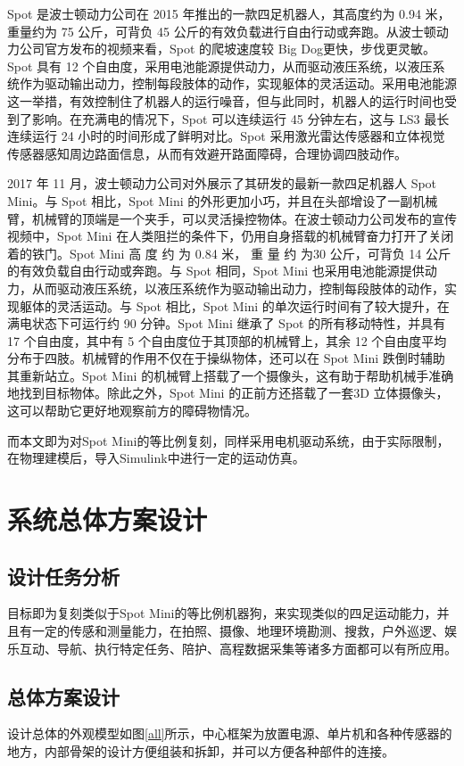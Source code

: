 \documentclass[10pt]{article}
\begin{document}
Spot 是波士顿动力公司在 2015 年推出的一款四足机器人，其高度约为 0.94 米，重量约为 75 公斤，可背负 45 公斤的有效负载进行自由行动或奔跑。从波士顿动力公司官方发布的视频来看，Spot 的爬坡速度较 Big Dog更快，步伐更灵敏。Spot 具有 12 个自由度，采用电池能源提供动力，从而驱动液压系统，以液压系统作为驱动输出动力，控制每段肢体的动作，实现躯体的灵活运动。采用电池能源这一举措，有效控制住了机器人的运行噪音，但与此同时，机器人的运行时间也受到了影响。在充满电的情况下，Spot 可以连续运行 45 分钟左右，这与 LS3 最长连续运行 24 小时的时间形成了鲜明对比。Spot 采用激光雷达传感器和立体视觉传感器感知周边路面信息，从而有效避开路面障碍，合理协调四肢动作。

2017 年 11 月，波士顿动力公司对外展示了其研发的最新一款四足机器人 Spot Mini。与 Spot 相比，Spot Mini 的外形更加小巧，并且在头部增设了一副机械臂，机械臂的顶端是一个夹手，可以灵活操控物体。在波士顿动力公司发布的宣传视频中，Spot Mini 在人类阻拦的条件下，仍用自身搭载的机械臂奋力打开了关闭着的铁门。Spot Mini 高 度 约 为 0.84 米， 重 量 约 为30 公斤，可背负 14 公斤的有效负载自由行动或奔跑。与 Spot 相同，Spot Mini 也采用电池能源提供动力，从而驱动液压系统，以液压系统作为驱动输出动力，控制每段肢体的动作，实现躯体的灵活运动。与 Spot 相比，Spot Mini 的单次运行时间有了较大提升，在满电状态下可运行约 90 分钟。Spot Mini 继承了 Spot 的所有移动特性，并具有 17 个自由度，其中有 5 个自由度位于其顶部的机械臂上，其余 12 个自由度平均分布于四肢。机械臂的作用不仅在于操纵物体，还可以在 Spot Mini 跌倒时辅助其重新站立。Spot Mini 的机械臂上搭载了一个摄像头，这有助于帮助机械手准确地找到目标物体。除此之外，Spot Mini 的正前方还搭载了一套3D 立体摄像头，这可以帮助它更好地观察前方的障碍物情况。

而本文即为对Spot Mini的等比例复刻，同样采用电机驱动系统，由于实际限制，在物理建模后，导入Simulink中进行一定的运动仿真。

\section{系统总体方案设计}
\subsection{设计任务分析}
目标即为复刻类似于Spot Mini的等比例机器狗，来实现类似的四足运动能力，并且有一定的传感和测量能力，在拍照、摄像、地理环境勘测、搜救，户外巡逻、娱乐互动、导航、执行特定任务、陪护、高程数据采集等诸多方面都可以有所应用。

\subsection{总体方案设计}
设计总体的外观模型如图\ref{all}所示，中心框架为放置电源、单片机和各种传感器的地方，内部骨架的设计方便组装和拆卸，并可以方便各种部件的连接。
\end{document}
